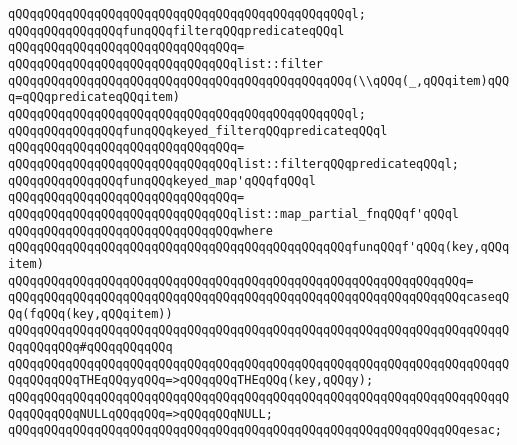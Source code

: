 \verb|qQQqqQQqqQQqqQQqqQQqqQQqqQQqqQQqqQQqqQQqqQQqqQQql;|\newline
\newline
\verb|qQQqqQQqqQQqqQQqfunqQQqfilterqQQqpredicateqQQql|\newline
\verb|qQQqqQQqqQQqqQQqqQQqqQQqqQQqqQQq=|\newline
\verb|qQQqqQQqqQQqqQQqqQQqqQQqqQQqqQQqlist::filter|\newline
\verb|qQQqqQQqqQQqqQQqqQQqqQQqqQQqqQQqqQQqqQQqqQQqqQQq(\\qQQq(_,qQQqitem)qQQq=qQQqpredicateqQQqitem)|\newline
\verb|qQQqqQQqqQQqqQQqqQQqqQQqqQQqqQQqqQQqqQQqqQQqqQQql;|\newline
\newline
\verb|qQQqqQQqqQQqqQQqfunqQQqkeyed_filterqQQqpredicateqQQql|\newline
\verb|qQQqqQQqqQQqqQQqqQQqqQQqqQQqqQQq=|\newline
\verb|qQQqqQQqqQQqqQQqqQQqqQQqqQQqqQQqlist::filterqQQqpredicateqQQql;|\newline
\newline
\newline
\verb|qQQqqQQqqQQqqQQqfunqQQqkeyed_map'qQQqfqQQql|\newline
\verb|qQQqqQQqqQQqqQQqqQQqqQQqqQQqqQQq=|\newline
\verb|qQQqqQQqqQQqqQQqqQQqqQQqqQQqqQQqlist::map_partial_fnqQQqf'qQQql|\newline
\verb|qQQqqQQqqQQqqQQqqQQqqQQqqQQqqQQqwhere|\newline
\verb|qQQqqQQqqQQqqQQqqQQqqQQqqQQqqQQqqQQqqQQqqQQqqQQqfunqQQqf'qQQq(key,qQQqitem)|\newline
\verb|qQQqqQQqqQQqqQQqqQQqqQQqqQQqqQQqqQQqqQQqqQQqqQQqqQQqqQQqqQQqqQQq=|\newline
\verb|qQQqqQQqqQQqqQQqqQQqqQQqqQQqqQQqqQQqqQQqqQQqqQQqqQQqqQQqqQQqqQQqcaseqQQq(fqQQq(key,qQQqitem))|\newline
\verb|qQQqqQQqqQQqqQQqqQQqqQQqqQQqqQQqqQQqqQQqqQQqqQQqqQQqqQQqqQQqqQQqqQQqqQQqqQQqqQQq#qQQqqQQqqQQq|\newline
\verb|qQQqqQQqqQQqqQQqqQQqqQQqqQQqqQQqqQQqqQQqqQQqqQQqqQQqqQQqqQQqqQQqqQQqqQQqqQQqqQQqTHEqQQqyqQQq=>qQQqqQQqTHEqQQq(key,qQQqy);|\newline
\verb|qQQqqQQqqQQqqQQqqQQqqQQqqQQqqQQqqQQqqQQqqQQqqQQqqQQqqQQqqQQqqQQqqQQqqQQqqQQqqQQqNULLqQQqqQQq=>qQQqqQQqNULL;|\newline
\verb|qQQqqQQqqQQqqQQqqQQqqQQqqQQqqQQqqQQqqQQqqQQqqQQqqQQqqQQqqQQqqQQqesac;|\newline

